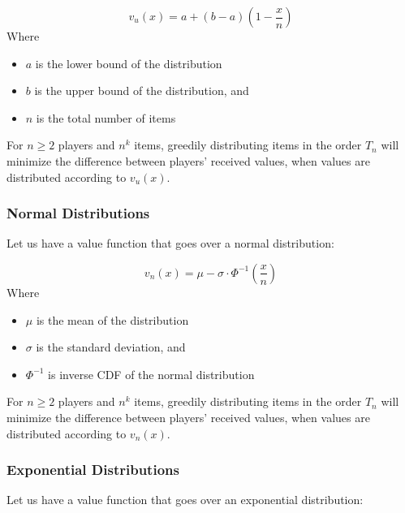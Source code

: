 \documentclass[conference]{IEEEtran}
\begin{document}
\begin{equation}
    v_u(x) = a+(b-a)(1-\dfrac{x}{n})
\end{equation}
Where \begin{itemize}
    \item $a$ is the lower bound of the distribution
    \item $b$ is the upper bound of the distribution, and
    \item $n$ is the total number of items
\end{itemize}

\begin{conjecture}
\label{conj:equit_dist_uniform}
For $n \ge 2$ players and $n^k$ items, greedily distributing items in the order $T_n$ will minimize the difference between players' received values, when values are distributed according to $v_u(x)$.
\end{conjecture}

\subsubsection{Normal Distributions}

Let us have a value function that goes over a normal distribution:

\begin{equation}
    v_n(x) =\mu-\sigma \cdot \Phi^{-1}\left(\dfrac{x}{n}\right)
\end{equation}
Where \begin{itemize}
    \item $\mu$ is the mean of the distribution
    \item $\sigma$ is the standard deviation, and
    \item $\Phi^{-1}$ is inverse CDF of the normal distribution
\end{itemize}

\begin{conjecture}
\label{conj:equit_dist_normal}    
For $n \ge 2$ players and $n^k$ items, greedily distributing items in the order $T_n$ will minimize the difference between players' received values, when values are distributed according to $v_n(x)$.
\end{conjecture}

\subsubsection{Exponential Distributions}

Let us have a value function that goes over an exponential distribution:
\end{document}
